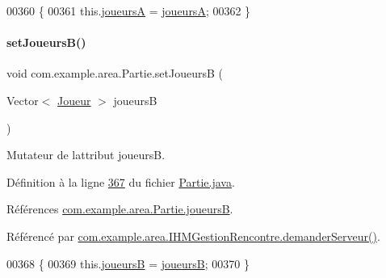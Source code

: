 \begin{DoxyCode}
00360     \{
00361         this.\hyperlink{classcom_1_1example_1_1area_1_1_partie_a190a033a96ec435589ac53f78d60890b}{joueursA} = \hyperlink{classcom_1_1example_1_1area_1_1_partie_a190a033a96ec435589ac53f78d60890b}{joueursA};
00362     \}
\end{DoxyCode}
\mbox{\label{classcom_1_1example_1_1area_1_1_partie_a3f3cc9b2ddd055945b8b0835d0e7466b}} 
\paragraph{\texorpdfstring{set\+Joueurs\+B()}{setJoueursB()}}
{\footnotesize\ttfamily void com.\+example.\+area.\+Partie.\+set\+JoueursB (\begin{DoxyParamCaption}\item[{Vector$<$ \hyperlink{classcom_1_1example_1_1area_1_1_joueur}{Joueur} $>$}]{joueursB }\end{DoxyParamCaption})}



Mutateur de l\textquotesingle{}attribut joueursB. 



Définition à la ligne \hyperlink{_partie_8java_source_l00367}{367} du fichier \hyperlink{_partie_8java_source}{Partie.\+java}.



Références \hyperlink{_partie_8java_source_l00038}{com.\+example.\+area.\+Partie.\+joueursB}.



Référencé par \hyperlink{_i_h_m_gestion_rencontre_8java_source_l00222}{com.\+example.\+area.\+I\+H\+M\+Gestion\+Rencontre.\+demander\+Serveur()}.


\begin{DoxyCode}
00368     \{
00369         this.\hyperlink{classcom_1_1example_1_1area_1_1_partie_a208910b83df461c3a2503f3b28650ce8}{joueursB} = \hyperlink{classcom_1_1example_1_1area_1_1_partie_a208910b83df461c3a2503f3b28650ce8}{joueursB};
00370     \}
\end{DoxyCode}
\mbox{\label{classcom_1_1example_1_1area_1_1_partie_a34c737de89dee9e2510fa5959e238a3e}} 
